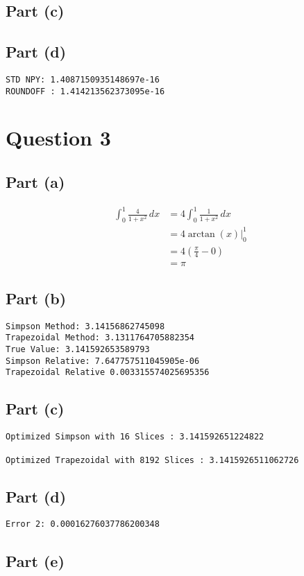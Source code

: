 \documentclass[reprint, amsmath,amssymb, aps]{revtex4-2}
\begin{document}
\subsection{Part (c)}

\subsection{Part (d)}
\begin{lstlisting}[style=console]
STD NPY: 1.4087150935148697e-16
ROUNDOFF : 1.414213562373095e-16
\end{lstlisting}

\section{Question 3}
\subsection{Part (a)}
    \begin{align*}
        \int_{0}^{1} \frac{4}{1 + x^2}\,dx &= 4 \int_{0}^{1} \frac{1}{1 + x^2}\,dx \\
        &= 4 \arctan(x) \Big|_{0}^{1} \\
        &= 4 (\frac{\pi}{4} - 0) \\
        &= \pi
    \end{align*}
\subsection{Part (b)}
\begin{lstlisting}[style=console]
Simpson Method: 3.14156862745098
Trapezoidal Method: 3.1311764705882354
True Value: 3.141592653589793
Simpson Relative: 7.647757511045905e-06
Trapezoidal Relative 0.003315574025695356
\end{lstlisting}
\subsection{Part (c)}
\begin{lstlisting}[style=console]
Optimized Simpson with 16 Slices : 3.141592651224822

Optimized Trapezoidal with 8192 Slices : 3.1415926511062726
\end{lstlisting}
\subsection{Part (d)}

\begin{lstlisting}[style=console]
Error 2: 0.00016276037786200348
\end{lstlisting}

\subsection{Part (e)}

           
\end{document}
